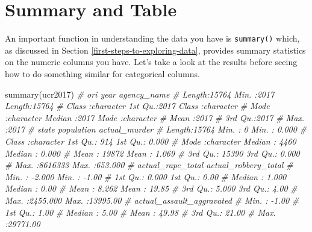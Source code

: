 \documentclass[
  a4paper,
]{krantz}
\makeatletter
\newenvironment{Shaded}{\begin{snugshade}}{\end{snugshade}}
\newcommand{\CommentTok}[1]{\textcolor[rgb]{0.37,0.37,0.37}{\textit{#1}}}
\newcommand{\FunctionTok}[1]{\textcolor[rgb]{0,0,0}{#1}}
\newcommand{\NormalTok}[1]{#1}
\newenvironment{kframe}{%
\medskip{}
\setlength{\fboxsep}{.8em}
 \def\at@end@of@kframe{}%
 \ifinner\ifhmode%
  \def\at@end@of@kframe{\end{minipage}}%
  \begin{minipage}{\columnwidth}%
 \fi\fi%
 \def\FrameCommand##1{\hskip\@totalleftmargin \hskip-\fboxsep
 \colorbox{shadecolor}{##1}\hskip-\fboxsep
     \hskip-\linewidth \hskip-\@totalleftmargin \hskip\columnwidth}%
 \MakeFramed {\advance\hsize-\width
   \@totalleftmargin\z@ \linewidth\hsize
   \@setminipage}}%
 {\par\unskip\endMakeFramed%
 \at@end@of@kframe}
\renewenvironment{Shaded}{\begin{kframe}}{\end{kframe}}
\makeatother
\begin{document}
\hypertarget{summary-and-table}{%
\section{Summary and Table}\label{summary-and-table}}

An important function in understanding the data you have is
\texttt{summary()} which, as discussed in Section
\ref{first-steps-to-exploring-data}, provides summary
statistics on the numeric columns you have. Let's take a
look at the results before seeing how to do something
similar for categorical columns.

\begin{Shaded}
\begin{Highlighting}[]
\FunctionTok{summary}\NormalTok{(ucr2017)}
\CommentTok{\#      ori                 year      agency\_name       }
\CommentTok{\#  Length:15764       Min.   :2017   Length:15764      }
\CommentTok{\#  Class :character   1st Qu.:2017   Class :character  }
\CommentTok{\#  Mode  :character   Median :2017   Mode  :character  }
\CommentTok{\#                     Mean   :2017                     }
\CommentTok{\#                     3rd Qu.:2017                     }
\CommentTok{\#                     Max.   :2017                     }
\CommentTok{\#     state             population      actual\_murder    }
\CommentTok{\#  Length:15764       Min.   :      0   Min.   :  0.000  }
\CommentTok{\#  Class :character   1st Qu.:    914   1st Qu.:  0.000  }
\CommentTok{\#  Mode  :character   Median :   4460   Median :  0.000  }
\CommentTok{\#                     Mean   :  19872   Mean   :  1.069  }
\CommentTok{\#                     3rd Qu.:  15390   3rd Qu.:  0.000  }
\CommentTok{\#                     Max.   :8616333   Max.   :653.000  }
\CommentTok{\#  actual\_rape\_total  actual\_robbery\_total}
\CommentTok{\#  Min.   :  {-}2.000   Min.   :   {-}1.00    }
\CommentTok{\#  1st Qu.:   0.000   1st Qu.:    0.00    }
\CommentTok{\#  Median :   1.000   Median :    0.00    }
\CommentTok{\#  Mean   :   8.262   Mean   :   19.85    }
\CommentTok{\#  3rd Qu.:   5.000   3rd Qu.:    4.00    }
\CommentTok{\#  Max.   :2455.000   Max.   :13995.00    }
\CommentTok{\#  actual\_assault\_aggravated}
\CommentTok{\#  Min.   :   {-}1.00         }
\CommentTok{\#  1st Qu.:    1.00         }
\CommentTok{\#  Median :    5.00         }
\CommentTok{\#  Mean   :   49.98         }
\CommentTok{\#  3rd Qu.:   21.00         }
\CommentTok{\#  Max.   :29771.00}
\end{Highlighting}
\end{Shaded}
\end{document}
